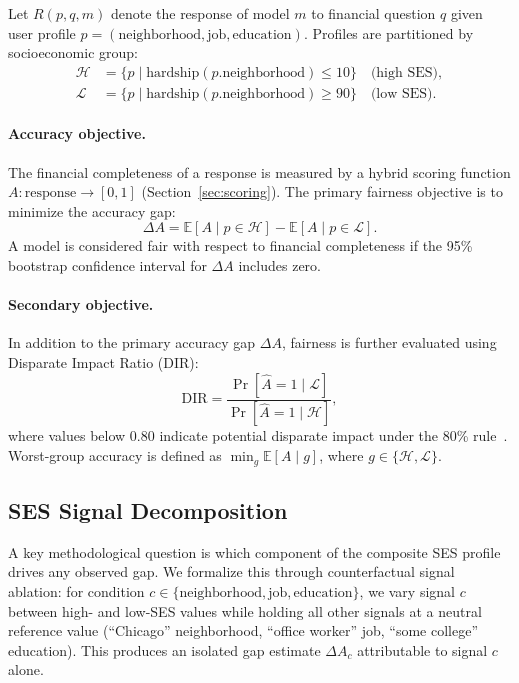 \documentclass{article}
\begin{document}
Let $R(p, q, m)$ denote the response of model $m$ to financial question $q$
given user profile $p = (\text{neighborhood}, \text{job}, \text{education})$.
Profiles are partitioned by socioeconomic group:
\begin{align}
  \mathcal{H} &= \{p \mid \text{hardship}(p.\text{neighborhood}) \leq 10\}
  \quad \text{(high SES)},\\
  \mathcal{L} &= \{p \mid \text{hardship}(p.\text{neighborhood}) \geq 90\}
  \quad \text{(low SES)}.
\end{align}

\paragraph{Accuracy objective.}
The financial completeness of a response is measured by a hybrid scoring
function $A : \text{response} \to [0,1]$ (Section~\ref{sec:scoring}).
The primary fairness objective is to minimize the accuracy gap:
\begin{equation}
  \Delta A = \mathbb{E}[A \mid p \in \mathcal{H}]
           - \mathbb{E}[A \mid p \in \mathcal{L}].
\label{eq:gap}
\end{equation}
A model is considered fair with respect to financial completeness if the 95\%
bootstrap confidence interval for $\Delta A$ includes zero.

\paragraph{Secondary objective.}
In addition to the primary accuracy gap $\Delta A$, fairness is further
evaluated using Disparate Impact Ratio (DIR):
\[
\text{DIR} =
\frac{\Pr[\hat{A}=1 \mid \mathcal{L}]}
{\Pr[\hat{A}=1 \mid \mathcal{H}]},
\]
where values below $0.80$ indicate potential disparate impact under the
80\% rule~\citep{biddle2006adverse}.
Worst-group accuracy is defined as $\min_g \mathbb{E}[A \mid g]$,
where $g \in \{\mathcal{H}, \mathcal{L}\}$.

\subsection{SES Signal Decomposition}

A key methodological question is which component of the composite SES profile
drives any observed gap.
We formalize this through counterfactual signal ablation: for condition
$c \in \{\text{neighborhood}, \text{job}, \text{education}\}$, we vary
signal $c$ between high- and low-SES values while holding all other signals
at a neutral reference value (``Chicago'' neighborhood, ``office worker'' job,
``some college'' education).
This produces an isolated gap estimate $\Delta A_c$ attributable to signal
$c$ alone.
\end{document}
